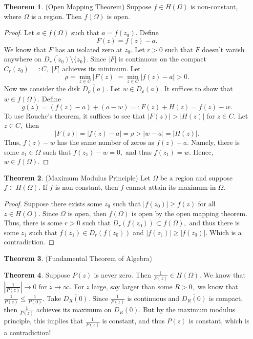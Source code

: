 \documentclass[10pt, oneside]{article}
\newcommand{\sm}{\setminus}
\theoremstyle{definition}
\newtheorem{thm}{Theorem}
\newcommand{\sm}{\setminus}
\begin{document}
\begin{thm}
    (Open Mapping Theorem) Suppose $f \in H(\Omega)$ is non-constant, where $\Omega$ is a region. Then $f(\Omega)$ is open. 
\end{thm}
\begin{proof}
    Let $a \in f(\Omega)$ such that $a = f(z_0)$. Define 
    \[F(z) = f(z) -a.\] We know that $F$ has an isolated zero at $z_0.$ Let $r>0$ such that $F$ doesn't vanish anywhere on $\overline{D_r(z_0)}\sm \{z_0\}.$ Since $|F|$ is continuous on the compact $C_r(z_0)=: C,$ $|F|$ achieves its minimum. Let 
    \[\rho = \min_{z\in C}|F(z)| = \min_{z\in C}|f(z)- a|>0.\] Now we consider the disk $\overline{D_\rho(a)}.$ Let $w \in D_\rho(a).$ It suffices to show that $w\in f(\Omega).$ Define 
    \[g(z) = (f(z) - a) + (a- w) =: F(z) + H(z) = f(z)-w.\] To use Rouche's theorem, it suffices to see that $|F(z)|>|H(z)|$ for $z\in C.$ Let $z\in C,$ then 
    \[|F(z)| = |f(z) - a| = \rho > |w-a| = |H(z)|.\] Thus, $f(z) - w$ has the same number of zeros as $f(z) - a.$  Namely, there is some $z_1 \in \Omega$ such that $f(z_1) - w = 0,$ and thus $f(z_1) = w.$ Hence, $w \in f(\Omega).$
\end{proof}

\begin{thm}
    (Maximum Modulus Principle) Let $\Omega$ be a region and suppose $f\in H(\Omega).$ If $f$ is non-constant, then $f$ cannot attain its maximum in $\Omega.$
\end{thm}
\begin{proof}
    Suppose there exists some $z_0$ such that $|f(z_0)| \geq f(z)$ for all $z\in H(O).$ Since $\Omega$ is open, then $f(\Omega)$ is open by the open mapping theorem. Thus, there is some $r>0$ such that $D_r(f(z_0))\subset f(\Omega),$ and thus there is some $z_1$ such that $f(z_1) \in D_r(f(z_0))$ and $|f(z_1)| \geq |f(z_0)|.$ Which is a contradiction.
\end{proof}

\begin{thm}
    (Fundamental Theorem of Algebra)
\end{thm}

\begin{thm}
    Suppose $P(z)$ is never zero. Then $
    \frac{1}{P(z)}\in H(\Omega).$ We know that $|\frac{1}{P(z)}|\to 0$ for $z\to \infty.$ For $z$ large, say larger than some $R>0,$ we know that $\frac{1}{P(z)} \leq \frac{1}{P(0)}.$ Take $\overline{D_R(0)}.$ Since $\frac{1}{P(z)}$ is continuous and $\overline{D_R(0)}$ is compact, then $\frac{1}{P(z)}$ achieves its maximum on $\overline{D_R(0)}.$ But by the maximum modulus principle, this implies that $\frac{1}{P(z)}$ is constant, and thus $P(z)$ is constant, which is a contradiction!
\end{thm}
\newpage
\end{document}
